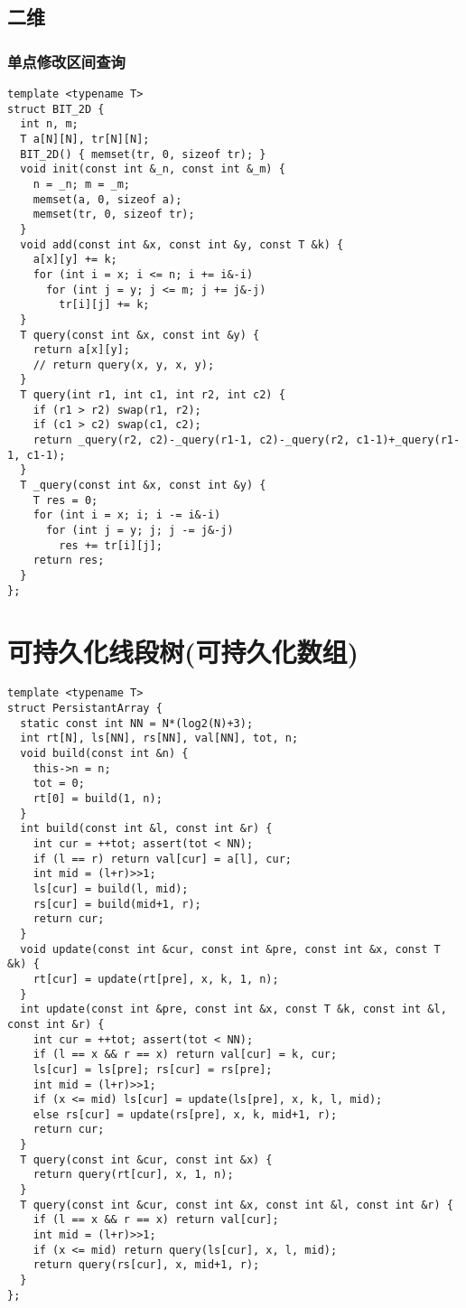 \documentclass[12pt]{article}
\begin{document}
{{{{{{{{{{{{{{{{{{\subsection{二维}
\subsubsection{单点修改区间查询}
{\setmainfont{Consolas}
\begin{lstlisting}
template <typename T>
struct BIT_2D {
  int n, m;
  T a[N][N], tr[N][N];
  BIT_2D() { memset(tr, 0, sizeof tr); }
  void init(const int &_n, const int &_m) {
    n = _n; m = _m;
    memset(a, 0, sizeof a);
    memset(tr, 0, sizeof tr);
  }
  void add(const int &x, const int &y, const T &k) {
    a[x][y] += k;
    for (int i = x; i <= n; i += i&-i)
      for (int j = y; j <= m; j += j&-j)
        tr[i][j] += k;
  }
  T query(const int &x, const int &y) {
    return a[x][y];
    // return query(x, y, x, y);
  }
  T query(int r1, int c1, int r2, int c2) {
    if (r1 > r2) swap(r1, r2);
    if (c1 > c2) swap(c1, c2);
    return _query(r2, c2)-_query(r1-1, c2)-_query(r2, c1-1)+_query(r1-1, c1-1);
  }
  T _query(const int &x, const int &y) {
    T res = 0;
    for (int i = x; i; i -= i&-i)
      for (int j = y; j; j -= j&-j)
        res += tr[i][j];
    return res;
  }
};
\end{lstlisting}

\section{可持久化线段树(可持久化数组)}

{\setmainfont{Consolas}
\begin{lstlisting}
template <typename T>
struct PersistantArray {
  static const int NN = N*(log2(N)+3);
  int rt[N], ls[NN], rs[NN], val[NN], tot, n;
  void build(const int &n) {
    this->n = n;
    tot = 0;
    rt[0] = build(1, n);
  }
  int build(const int &l, const int &r) {
    int cur = ++tot; assert(tot < NN);
    if (l == r) return val[cur] = a[l], cur;
    int mid = (l+r)>>1;
    ls[cur] = build(l, mid);
    rs[cur] = build(mid+1, r);
    return cur;
  }
  void update(const int &cur, const int &pre, const int &x, const T &k) {
    rt[cur] = update(rt[pre], x, k, 1, n);
  }
  int update(const int &pre, const int &x, const T &k, const int &l, const int &r) {
    int cur = ++tot; assert(tot < NN);
    if (l == x && r == x) return val[cur] = k, cur;
    ls[cur] = ls[pre]; rs[cur] = rs[pre];
    int mid = (l+r)>>1;
    if (x <= mid) ls[cur] = update(ls[pre], x, k, l, mid);
    else rs[cur] = update(rs[pre], x, k, mid+1, r);
    return cur;
  }
  T query(const int &cur, const int &x) {
    return query(rt[cur], x, 1, n);
  }
  T query(const int &cur, const int &x, const int &l, const int &r) {
    if (l == x && r == x) return val[cur];
    int mid = (l+r)>>1;
    if (x <= mid) return query(ls[cur], x, l, mid);
    return query(rs[cur], x, mid+1, r);
  }
};
\end{lstlisting}

}}}}}}}}}}}}}}}}}}}}
\end{document}

